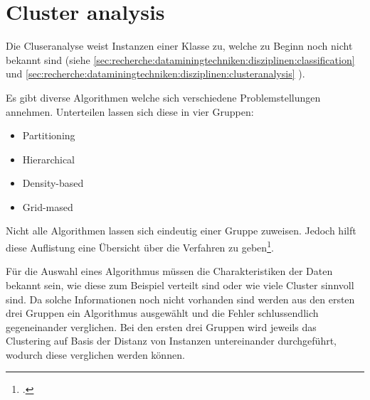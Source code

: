 %
%
%

\section{Cluster analysis}
\label{sec:konzept:clusteranalysis}
Die Cluseranalyse weist Instanzen einer Klasse zu, welche zu Beginn noch nicht bekannt sind (siehe \cref{sec:recherche:dataminingtechniken:disziplinen:classification}  und \cref{sec:recherche:dataminingtechniken:disziplinen:clusteranalysis} ).

Es gibt diverse Algorithmen welche sich verschiedene Problemstellungen annehmen. Unterteilen lassen sich diese in vier Gruppen:
\begin{itemize}
	\item Partitioning
	\item Hierarchical
	\item Density-based
	\item Grid-mased
\end{itemize}
Nicht alle Algorithmen lassen sich eindeutig einer Gruppe zuweisen. Jedoch hilft diese Auflistung eine Übersicht über die Verfahren zu geben\footcite{data_mining_concepts_and_techniques}.

Für die Auswahl eines Algorithmus müssen die Charakteristiken der Daten bekannt sein, wie diese zum Beispiel verteilt sind oder wie viele Cluster sinnvoll sind. 
Da solche Informationen noch nicht vorhanden sind werden aus den ersten drei Gruppen ein Algorithmus ausgewählt und die Fehler schlussendlich gegeneinander verglichen.
Bei den ersten drei Gruppen wird jeweils das Clustering auf Basis der Distanz von Instanzen untereinander durchgeführt, wodurch diese verglichen werden können.
 
